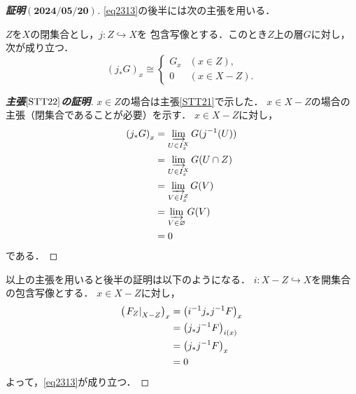 \begin{proof}[\textbf{証明\((\mathbf{2024/05/20})\)}]
    \eqref{eq2313}の後半には次の主張を用いる．
    \begin{leftbar}
    \begin{STT}\label{STT22}
        \(Z\)を\(X\)の閉集合とし，\(j\colon Z\hookrightarrow X\)を
        包含写像とする．このとき\(Z\)上の層\(G\)に対し，次が成り立つ．
        \[\left(j_{\ast}G\right)_x
        \cong\begin{cases}
            G_x& (x\in Z),\\
            0&(x\in X-Z).
        \end{cases}\]
    \end{STT}
    \end{leftbar}
    \begin{center}
        \begin{minipage}{.9\textwidth}
            \begin{proof}[\textbf{主張\(\mathbf{\ref{STT22}}\)の証明}]
                \(x\in Z\)の場合は主張\ref{STT21}で示した．
                \(x\in X-Z\)の場合の主張（閉集合であることが必要）を示す．
                \(x\in X-Z\)に対し，
                \begin{align*}
                    \left(j_{\ast}G\right)_{x}
                    &=\indlim[U\in I_{x}^X]G(j^{-1}(U))\\
                    &=\indlim[U\in I_{x}^X]G(U\cap Z)\\
                    &=\indlim[V\in I_{x}^Z]G(V)\\
                    &=\indlim[V\in \varnothing]G(V)\\
                    &=0
                \end{align*}
                である．
            \end{proof}
        \end{minipage}
     \end{center}        
    
    以上の主張を用いると後半の証明は以下のようになる．
    \(i\colon X-Z\hookrightarrow X\)を開集合の包含写像とする．
    \(x\in X-Z\)に対し，
    \begin{align*}
        \left(\mres[F_Z]{X-Z}\right)_{x}
        &=\left(i^{-1}j_{\ast}j^{-1}F\right)_x\\
        &=\left(j_{\ast}j^{-1}F\right)_{i(x)}\\
        &=\left(j_{\ast}j^{-1}F\right)_{x}\\
        &=0
    \end{align*}
    よって，\eqref{eq2313}が成り立つ．
\end{proof}

